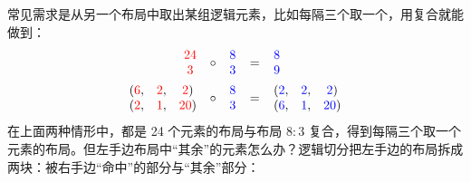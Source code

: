 常见需求是从另一个布局中取出某组逻辑元素，比如每隔三个取一个，用复合就能做到：
\begin{align*}
\begin{array}{c} \textcolor{red}{24} \\ \textcolor{red}{3} \end{array}
\ \circ \
\begin{array}{c} \textcolor{blue}{8} \\ \textcolor{blue}{3} \end{array}
\ &= \
\begin{array}{c} \textcolor{blue}{8} \\ \textcolor{blue}{9} \end{array} \\
\begin{array}{ccc} (\textcolor{red}{6}, & \textcolor{red}{2}, & \textcolor{red}{2}) \\ (\textcolor{red}{2}, & \textcolor{red}{1}, & \textcolor{red}{20}) \end{array}
\ \circ \
\begin{array}{c} \textcolor{blue}{8} \\ \textcolor{blue}{3} \end{array}
\ &= \
\begin{array}{ccc} (\textcolor{blue}{2}, & \textcolor{blue}{2}, & \textcolor{blue}{2}) \\ (\textcolor{blue}{6}, & \textcolor{blue}{1}, & \textcolor{blue}{20}) \end{array}
\end{align*}
在上面两种情形中，都是 24 个元素的布局与布局 $8:3$ 复合，得到每隔三个取一个元素的布局。但左手边布局中“其余”的元素怎么办？逻辑切分把左手边的布局拆成两块：被右手边“命中”的部分与“其余”部分：
